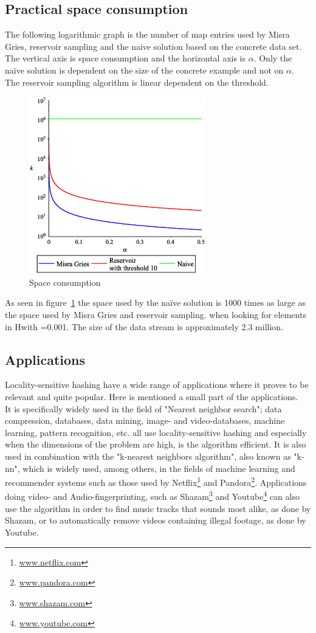 \subsection{Practical space consumption}
The following logarithmic graph is the number of map entries used by Misra Gries, reservoir sampling and the naive solution based on the concrete data set. The vertical axis is space consumption and the horizontal axis is \(\alpha\). Only the naïve solution is dependent on the size of the concrete example and not on \(\alpha\). The reservoir sampling algorithm is linear dependent on the threshold.
\begin{figure}[H]
	\centering
	\includegraphics[width=290px]{img/streamingMemoryGraph.eps}
	\caption{Space consumption}
	\label{fig:space_consumption}
\end{figure}
As seen in figure~\ref{fig:space_consumption} the space used by the naïve solution is 1000 times as large as the space used by Misra Gries and reservoir sampling. when looking for elements in Hwith =0.001. The size of the data stream is approximately 2.3 million.

\subsection{Applications}
Locality-sensitive hashing have a wide range of applications where it proves to be relevant and quite popular.\cite{mikkel1}\cite{mikkel2} Here is mentioned a small part of the applications.  \\
It is specifically widely used in the field of "Nearest neighbor search"; data compression, databases, data mining, image- and video-databases, machine learning, pattern recognition, etc. all use locality-sensitive hashing and especially when the dimensions of the problem are high, is the algorithm efficient.
It is also used in combination with the "k-nearest neighbors algorithm", also known as "k-nn", which is widely used, among others, in the fields of machine learning and recommender systems such as those used by Netflix\footnote{\url{www.netflix.com}} and Pandora\footnote{\url{www.pandora.com}}. Applications doing video- and Audio-fingerprinting, such as Shazam\footnote{\url{www.shazam.com}} and Youtube\footnote{\url{www.youtube.com}} can also use the algorithm in order to find music tracks that sounds most alike, as done by Shazam, or to automatically remove videos containing illegal footage, as done by Youtube.


